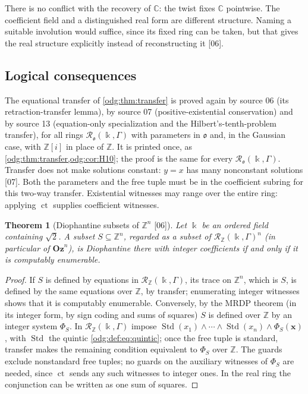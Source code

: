 \documentclass[11pt,oneside]{article}
\numberwithin{equation}{section}
\newtheorem{theorem}{Theorem}[section]
\theoremstyle{definition}
\theoremstyle{remark}
\newcommand{\Oz}{\mathbf{Oz}}
\newcommand{\Z}{\mathbb Z}
\newcommand{\C}{\mathbb C}
\newcommand{\ct}{\operatorname{ct}}
\newcommand{\Std}{\operatorname{Std}}
\newcommand{\src}[1]{\textup{\textsf{\small[#1]}}}
\begin{document}
There is no conflict with the recovery of $\C$: the twist fixes $\C$
pointwise. The coefficient field and a distinguished real form are different
structure. Naming a suitable involution would suffice, since its fixed ring
can be taken, but that gives the real structure explicitly instead of
reconstructing it \src{06}.

\subsection{Logical consequences}

The equational transfer of \cref{odg:thm:transfer} is proved again by source 06
(its retraction-transfer lemma), by source 07 (positive-existential
conservation) and by source 13 (equation-only specialization and the
Hilbert's-tenth-problem transfer), for all rings
$\mathcal R_{\mathfrak o}(\Bbbk,\Gamma)$ with parameters in $\mathfrak o$ and,
in the Gaussian case, with $\Z[i]$ in place of $\Z$. It is printed once, as
\cref{odg:thm:transfer,odg:cor:H10}; the proof is the same for every
$\mathcal R_{\mathfrak o}(\Bbbk,\Gamma)$. Transfer does not make solutions
constant: $y=x$ has many nonconstant solutions \src{07}.
Both the parameters and the free tuple must be in the coefficient subring
for this two-way transfer. Existential witnesses may range over the entire
ring: applying $\ct$ supplies coefficient witnesses.

\begin{theorem}[Diophantine subsets of $\Z^n$ \src{06}]\label{odg:def:thm:ce}
Let $\Bbbk$ be an ordered field containing $\sqrt2$. A subset $S\subseteq\Z^n$,
regarded as a subset of $\mathcal R_\Z(\Bbbk,\Gamma)^n$ (in particular of
$\Oz^n$), is Diophantine there with integer coefficients if and only if it is
computably enumerable.
\end{theorem}
\begin{proof}
If $S$ is defined by equations in $\mathcal R_\Z(\Bbbk,\Gamma)$, its trace on
$\Z^n$, which is $S$, is defined by the same equations over $\Z$, by
transfer; enumerating integer witnesses shows that it is computably
enumerable. Conversely, by the MRDP theorem \cite{Matiyasevich} (in its
integer form, by sign coding and sums of squares) $S$ is defined over $\Z$ by
an integer system $\Phi_S$. In $\mathcal R_\Z(\Bbbk,\Gamma)$ impose
$\Std(x_1)\wedge\cdots\wedge\Std(x_n)\wedge\Phi_S(\mathbf x)$, with $\Std$ the
quintic \eqref{odg:def:eq:quintic}; once the free tuple is standard, transfer
makes the remaining condition equivalent to $\Phi_S$ over $\Z$.
The guards exclude nonstandard free tuples; no guards on the auxiliary
witnesses of $\Phi_S$ are needed, since $\ct$ sends any such witnesses to
integer ones. In the real ring the conjunction can be written as one sum
of squares.
\end{proof}
\end{document}
